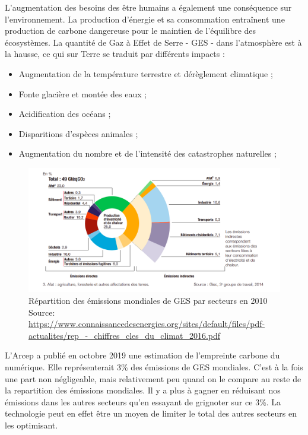 L'augmentation des besoins des être humains a également une conséquence sur l'environnement.
La production d'énergie et sa consommation entraînent une production de carbone dangereuse pour le maintien de l'équilibre des écosystèmes.
La quantité de Gaz à Effet de Serre - GES - dans l'atmosphère est à la hausse, ce qui sur Terre se traduit par différents impacts :
\begin{itemize}
  \item Augmentation de la température terrestre et dérèglement climatique ;
  \item Fonte glacière et montée des eaux ;
  \item Acidification des océans ;
  \item Disparitions d'espèces animales ;
  \item Augmentation du nombre et de l'intensité des catastrophes naturelles ;
\end{itemize}

\begin{figure}[h]
  \centering
  \includegraphics[scale=0.30]{media/repartition_ges.png}
  \caption{ Répartition des émissions mondiales de GES par secteurs en 2010\newline
      \tiny{Source:
        \url{https://www.connaissancedesenergies.org/sites/default/files/pdf-actualites/rep_-_chiffres_cles_du_climat_2016.pdf}
      }
  }
\end{figure}

L'Arcep a publié en octobre 2019 une estimation de l'empreinte carbone du numérique.
Elle représenterait 3\% des émissions de GES mondiales.
C'est à la fois une part non négligeable, mais relativement peu quand on le compare au reste de la repartition des émissions mondiales.
Il y a plus à gagner en réduisant nos émissions dans les autres secteurs qu'en essayant de grignoter sur ce 3\%.
La technologie peut en effet être un moyen de limiter le total des autres secteurs en les optimisant.


